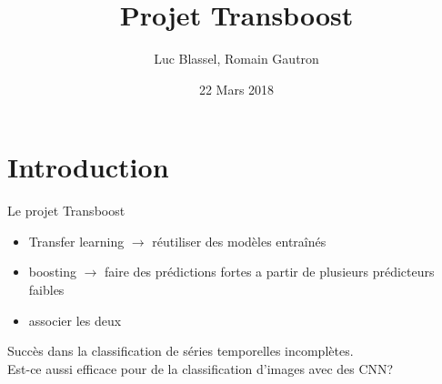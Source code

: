 \documentclass{beamer}
\title{Projet Transboost}
\author{Luc Blassel, Romain Gautron}
\date{22 Mars 2018}
\begin{document}
\begin{frame}
  \titlepage
\end{frame}

\section{Introduction}
\begin{frame}{Le projet Transboost}

\begin{itemize}
	\item Transfer learning $\rightarrow$ réutiliser des modèles entraînés
    \item boosting $\rightarrow$ faire des prédictions fortes a partir de plusieurs prédicteurs faibles
    \item associer les deux
\end{itemize}
    \medskip
    Succès dans la classification de séries temporelles incomplètes.\\
    Est-ce aussi efficace pour de la classification d'images avec des CNN?

\end{frame}
\end{document}
